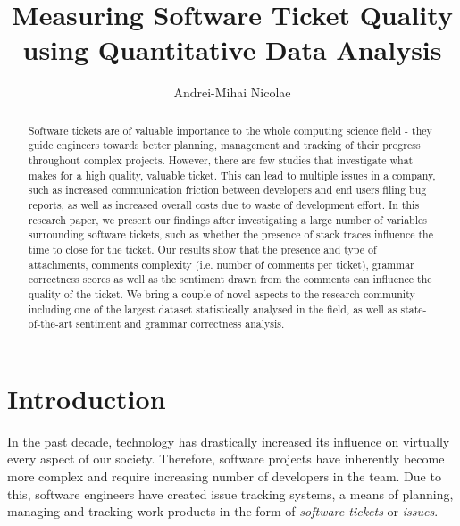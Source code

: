 \documentclass{mpaper}
\begin{document}
\title{Measuring Software Ticket Quality using Quantitative Data Analysis}
\author{Andrei-Mihai Nicolae}

\maketitle

\begin{abstract}
Software tickets are of valuable importance to the whole computing science 
field - they guide engineers towards better planning, management 
and tracking of their progress throughout complex projects. However, there
are few studies that investigate what makes for a high quality,
valuable ticket. This can lead to multiple issues in a company, such as 
increased communication friction between developers and end users filing bug
reports, as well as increased overall costs due to waste of development effort. 
In this research paper, we present our findings after 
investigating a large number of variables surrounding software tickets, 
such as whether the presence of stack traces influence the time 
to close for the ticket. Our results show that the presence and type of attachments,
comments complexity (i.e. number of comments per ticket), grammar correctness scores
as well as the sentiment drawn from the comments can influence the quality of the ticket.
We bring a couple of novel aspects to the research
community including one of the largest dataset statistically analysed in the field,
as well as state-of-the-art sentiment and grammar correctness analysis.
\end{abstract}

\section{Introduction}


In the past decade, technology has drastically increased its influence on 
virtually every aspect of our society. Therefore, software projects have 
inherently become more complex and require increasing number of developers in
the team. Due to this, software engineers have created issue tracking systems,
a means of planning, managing and tracking work products in the form of 
\emph{software tickets} or \emph{issues}.
\end{document}
